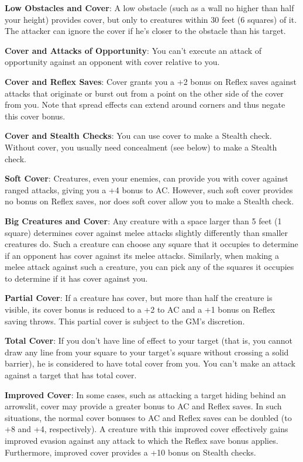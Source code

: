 \textbf{Low Obstacles and Cover}: A low obstacle (such as a wall no higher than half your height) provides cover, but only to creatures within 30 feet (6 squares) of it. The attacker can ignore the cover if he's closer to the obstacle than his target.
				
\textbf{Cover and Attacks of Opportunity}: You can't execute an attack of opportunity against an opponent with cover relative to you.
				
\textbf{Cover and Reflex Saves}: Cover grants you a +2 bonus on Reflex saves against attacks that originate or burst out from a point on the other side of the cover from you. Note that spread effects can extend around corners and thus negate this cover bonus.
				
\textbf{Cover and Stealth Checks}: You can use cover to make a Stealth check. Without cover, you usually need concealment (see below) to make a Stealth check.
				
\textbf{Soft Cover}: Creatures, even your enemies, can provide you with cover against ranged attacks, giving you a +4 bonus to AC. However, such soft cover provides no bonus on Reflex saves, nor does soft cover allow you to make a Stealth check.
				
\textbf{Big Creatures and Cover}: Any creature with a space larger than 5 feet (1 square) determines cover against melee attacks slightly differently than smaller creatures do. Such a creature can choose any square that it occupies to determine if an opponent has cover against its melee attacks. Similarly, when making a melee attack against such a creature, you can pick any of the squares it occupies to determine if it has cover against you.
				
\textbf{Partial Cover}: If a creature has cover, but more than half the creature is visible, its cover bonus is reduced to a +2 to AC and a +1 bonus on Reflex saving throws. This partial cover is subject to the GM's discretion.
				
\textbf{Total Cover}: If you don't have line of effect to your target (that is, you cannot draw any line from your square to your target's square without crossing a solid barrier), he is considered to have total cover from you. You can't make an attack against a target that has total cover.
				
\textbf{Improved Cover}: In some cases, such as attacking a target hiding behind an arrowslit, cover may provide a greater bonus to AC and Reflex saves. In such situations, the normal cover bonuses to AC and Reflex saves can be doubled (to +8 and +4, respectively). A creature with this improved cover effectively gains improved evasion against any attack to which the Reflex save bonus applies. Furthermore, improved cover provides a +10 bonus on Stealth checks.

